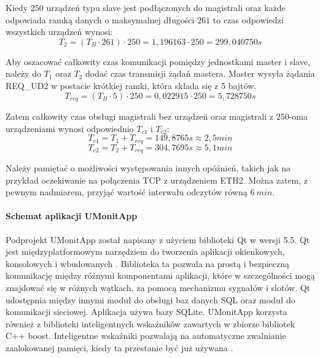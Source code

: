Kiedy 250 urządzeń typu slave jest podłączonych do magistrali oraz każde odpowiada ramką danych o maksymalnej długości $ 261 $ to czas odpowiedzi wszystkich urządzeń wynosi:
\begin{equation}
	\label{eq:all_devices_time}
	T_2 = (T_B \cdot 261) \cdot 250 = 1,196163 \cdot 250 = 299,040750 s
\end{equation}

Aby oszacować całkowity czas komunikacji pomiędzy jednostkami master i slave, należy do $ T_1 $ oraz $ T_2 $ dodać czas transmisji żądań mastera.
Master wysyła żądania REQ\_UD2 w postacie krótkiej ramki, która składa się z 5 bajtów.
\begin{equation}
	\label{eq:req_time}
	T_{req} = (T_B \cdot 5) \cdot 250 = 0,022915 \cdot 250 = 5,728750 s
\end{equation}

Zatem całkowity czas obsługi magistrali bez urządzeń oraz magistrali z 250-oma urządzeniami wynosi odpowiednio $ T_{c1} $ i $ T_{c2} $:
\begin{equation}
	\label{eq:no_device_total_time}
	T_{c1} = T_1 + T_{req} = 149,8765 s \approx 2,5 min
\end{equation}
\begin{equation}
	\label{eq:all_device_total_time}
	T_{c2} = T_2 + T_{req} = 304,7695 s \approx 5,1 min
\end{equation}

Należy pamiętać o możliwości występowania innych opóźnień, takich jak na przykład oczekiwanie na połączenia TCP z urządzeniem ETH2.
Można zatem, z pewnym nadmiarem, przyjąć wartość interwału odczytów równą $ 6\ min $.

\paragraph{Schemat aplikacji UMonitApp}

Podprojekt UMonitApp został napisany z użyciem biblioteki Qt w wersji 5.5.
Qt jest międzyplatformowym narzędziem do tworzenia aplikacji okienkowych, konsolowych i wbudowanych \cite{qt}.
Biblioteka ta pozwala na prostą i bezpieczną komunikację między różnymi komponentami aplikacji,
które w szczególności mogą znajdować się w różnych wątkach, za pomocą mechanizmu sygnałów i slotów.
Qt udostępnia między innymi moduł do obsługi baz danych SQL oraz moduł do komunikacji sieciowej.
Aplikacja używa bazy SQLite.
UMonitApp korzysta również z biblioteki inteligentnych wskaźników zawartych w zbiorze bibliotek C++ boost.
Inteligentne wskaźniki pozwalają na automatyczne zwalnianie zaalokowanej pamięci, kiedy ta przestanie być już używana \cite{smart_ptr}.

